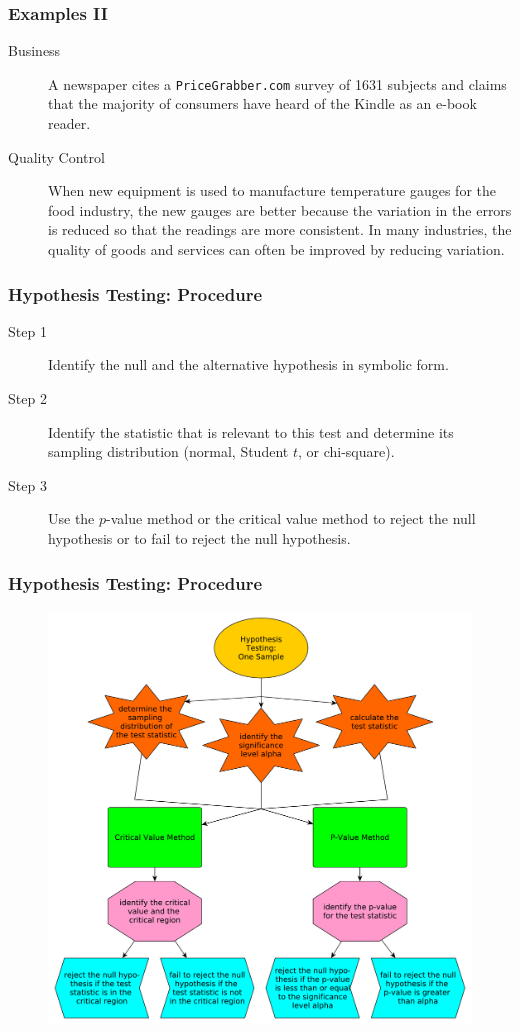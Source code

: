 \documentclass[xcolor=dvipsnames]{beamer}
\begin{document}
\begin{frame}
  \frametitle{Examples II}
  \begin{description}
  \item[Business] A newspaper cites a \texttt{PriceGrabber.com} survey
    of 1631 subjects and claims that the majority of consumers have
    heard of the Kindle as an e-book reader.
  \item[Quality Control] When new equipment is used to manufacture
    temperature gauges for the food industry, the new gauges are
    better because the variation in the errors is reduced so that the
    readings are more consistent. In many industries, the quality of
    goods and services can often be improved by reducing variation.
  \end{description}
\end{frame}

\begin{frame}
  \frametitle{Hypothesis Testing: Procedure}
  \begin{description}
  \item[Step 1] Identify the null and the alternative hypothesis in
    symbolic form.
  \item[Step 2] Identify the statistic that is relevant to this test
    and determine its sampling distribution (normal, Student $t$, or
    chi-square).
  \item[Step 3] Use the $p$-value method or the critical value method
    to reject the null hypothesis or to fail to reject the null
    hypothesis.
  \end{description}
\end{frame}

\begin{frame}
  \frametitle{Hypothesis Testing: Procedure}
  \begin{figure}[h]
    \includegraphics[scale=0.25]{./diagrams/hypoONEsample.pdf}
  \end{figure}
\end{frame}
\end{document}
